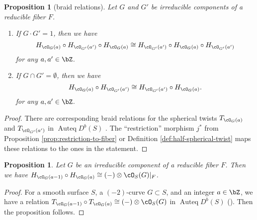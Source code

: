 \documentclass[12pt]{amsart}
\numberwithin{equation}{section}
\theoremstyle{plain}
\newtheorem{proposition}[theorem]{Proposition}
\theoremstyle{definition}
\DeclareMathOperator{\Auteq}{\mathrm{Auteq}}
\begin{document}
\begin{proposition}[braid relations]\label{prop:braid-relation}
    Let $G$ and $G'$ be irreducible components of a reducible fiber $F$.
    \begin{enumerate}
        \item If $G \cdot G' = 1$, then we have
              \begin{equation}
                  H_{\cO_G(a)} \circ H_{\cO_{G'}(a')} \circ H_{\cO_G(a)} \cong H_{\cO_{G'}(a')} \circ H_{\cO_G(a)} \circ H_{\cO_{G'}(a')}
              \end{equation}
              for any $a, a' \in \bZ$.
        \item If $G \cap G' = \emptyset$, then we have
              \begin{equation}
                  H_{\cO_G(a)} \circ H_{\cO_{G'}(a')} \cong H_{\cO_{G'}(a')} \circ H_{\cO_G(a)}.
              \end{equation}
              for any $a, a' \in \bZ$.
    \end{enumerate}
\end{proposition}
\begin{proof}
    There are corresponding braid relations for the spherical twists $T_{\cO_G(a)}$ and $T_{\cO_{G'}(a')}$ in $\Auteq D^b(S)$ \cite[Example 3.5]{MR1831820}.
    The ``restriction'' morphism $j^*$ from Proposition \ref{prop:restriction-to-fiber} or Definition \ref{def:half-spherical-twist} maps these relations to the ones in the statement.
\end{proof}

\begin{proposition}\label{prop:half-spherical-twist-and-line-bundle}
    Let $G$ be an irreducible component of a reducible fiber $F$.
    Then we have
    $H_{\cO_G(a-1)} \circ H_{\cO_G(a)} \cong (-) \otimes \cO_{S}(G)\lvert_{F}$.
\end{proposition}
\begin{proof}
    For a smooth surface $S$, a $(-2)$-curve $G \subset S$, and an integer $a \in \bZ$, we have a relation $T_{\cO_G(a-1)} \circ T_{\cO_G(a)} \cong (-) \otimes \cO_{S}(G)$ in $\Auteq D^b(S)$ (\cite[Lemma 4.15 (i)(2)]{MR2198807}).
    Then the proposition follows.
\end{proof}
\end{document}

